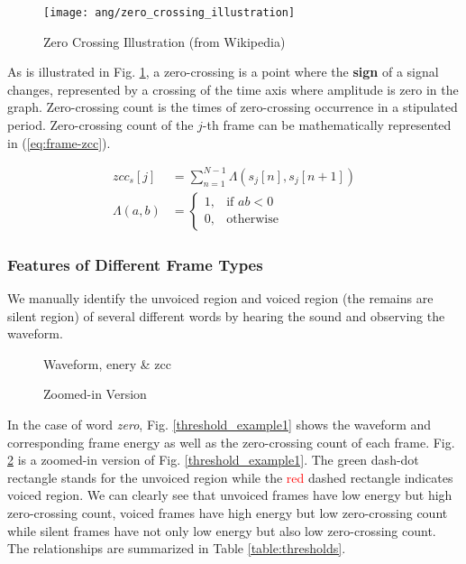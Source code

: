 \begin{figure}[H]
\centering
\texttt{[image: ang/zero\_crossing\_illustration]}
\caption{Zero Crossing Illustration (from Wikipedia)}
\label{zero_crossing_illustration}
\end{figure}

As is illustrated in Fig. \ref{zero_crossing_illustration}, a zero-crossing is a point where the \textbf{sign} of a signal changes, represented by a crossing of the time axis where amplitude is zero in the graph. Zero-crossing count is the times of zero-crossing occurrence in a stipulated period. Zero-crossing count of the $j$-th frame can be mathematically represented in (\ref{eq:frame-zcc}).

\begin{align}
\label{eq:frame-zcc}
zcc_s[j] &= \sum_{n=1}^{N-1} \Lambda ( s_j[n], s_j[n+1] )\\
\Lambda ( a, b ) &=
\begin{cases}
1, &\text{if } ab < 0\\
0, &\text{otherwise}
\end{cases}
\end{align}


\subsubsection{Features of Different Frame Types}

We manually identify the unvoiced region and voiced region (the remains are silent region) of several different words by hearing the sound and observing the waveform.

\begin{figure}[H]
\begin{minipage}[t]{0.5\linewidth}
\centering
{}
\caption{Waveform, enery \& zcc}
\label{threshold_example1}
\end{minipage}
\begin{minipage}[t]{0.5\linewidth}
\centering
{}
\caption{Zoomed-in Version}
\label{threshold_example2}
\end{minipage}
\end{figure}

In the case of word \textit{zero}, Fig. \ref{threshold_example1} shows the waveform and corresponding frame energy as well as the zero-crossing count of each frame. Fig. \ref{threshold_example2} is a zoomed-in version of Fig. \ref{threshold_example1}. The \textcolor{green_html}{green} dash-dot rectangle stands for the unvoiced region while the \textcolor{red}{red} dashed rectangle indicates voiced region. We can clearly see that unvoiced frames have low energy but high zero-crossing count, voiced frames have high energy but low zero-crossing count while silent frames have not only low energy but also low zero-crossing count. The relationships are summarized in Table \ref{table:thresholds}.


